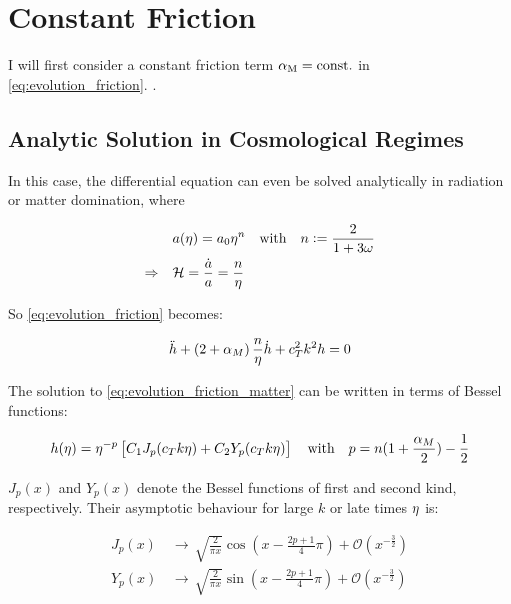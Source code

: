 \documentclass[parskip=half]{scrreprt}
\begin{document}
\section{Constant Friction}

I will first consider a constant friction term $\alpha_\mathrm{M}=\mathrm{const.}$ in \eqref{eq:evolution_friction}. \citep{Pettorino2014}. 



\subsection{Analytic Solution in Cosmological Regimes}

In this case, the differential equation can even be solved analytically in radiation or matter domination, where

\begin{align}
	&a(\eta) = a_0 \eta^n \quad \text{with} \quad n := \frac{2}{1+3\omega} \\
	\Rightarrow \quad &\mathcal{H} = \frac{\dot{a}}{a} = \frac{n}{\eta}
\end{align}

So \ref{eq:evolution_friction} becomes:

\begin{equation}\label{eq:evolution_friction_matter}
	\ddot{h} + \left( 2 + \alpha_M \right) \frac{n}{\eta} \dot{h} + c_T^2 k^2 h = 0
\end{equation}

The solution to \ref{eq:evolution_friction_matter} can be written in terms of Bessel functions:

\begin{equation}
	h(\eta) = \eta^{-p} \left[C_1 J_p(c_T k \eta) + C_2 Y_p(c_T k \eta) \right] \quad \text{with} \quad p = n(1+\frac{\alpha_M}{2})-\frac{1}{2}
\end{equation}

$J_p(x)$ and $Y_p(x)$ denote the Bessel functions of first and second kind, respectively. Their asymptotic behaviour for large $k$ or late times $\eta$ is:

\begin{align}
	J_p(x) \, &\rightarrow \, \sqrt{\frac{2}{\pi x}} \cos(x-\frac{2p+1}{4}\pi) + \mathcal{O}(x^{-\frac{3}{2}}) \\
	Y_p(x) \, &\rightarrow \, \sqrt{\frac{2}{\pi x}} \sin(x-\frac{2p+1}{4}\pi) + \mathcal{O}(x^{-\frac{3}{2}})
\end{align}
\end{document}
